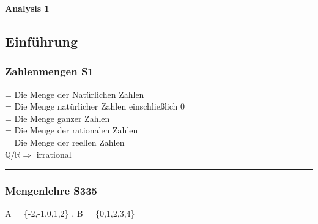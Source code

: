 \parbox{4cm}{
	\huge{\textbf{Analysis 1}}
}

\subsection{Einführung} %


\subsubsection{Zahlenmengen \color{red} S1} %
\color{black}
\label{sub:allgemeines}

 =    Die Menge der Natürlichen Zahlen\\
   =   Die Menge natürlicher Zahlen einschließlich 0 \\
 =   Die Menge ganzer Zahlen\\
 =   Die Menge der rationalen Zahlen\\
 = \makebox[4cm]{}   Die Menge der reellen Zahlen\\
$\mathbb Q / \mathbb R \Rightarrow$ irrational
\hrule

\subsubsection{Mengenlehre \color{red} S335} %
\color{black}
\label{sub:allgemeines}
A = \{-2,-1,0,1,2\} , B = \{0,1,2,3,4\}\\

